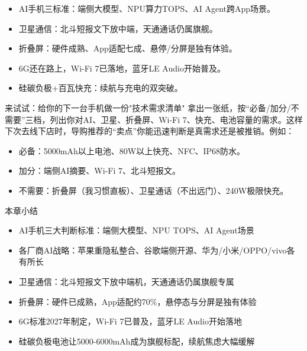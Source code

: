 \begin{itemize}
  \item AI手机三标准：端侧大模型、NPU算力TOPS、AI Agent跨App场景。
  \item 卫星通信：北斗短报文下放中端，天通通话仍属旗舰。
  \item 折叠屏：硬件成熟、App适配七成、悬停/分屏是独有体验。
  \item 6G还在路上，Wi-Fi 7已落地，蓝牙LE Audio开始普及。
  \item 硅碳负极+百瓦快充：续航与充电的双突破。
\end{itemize}

\begin{tcbpractice}{来试试：给你的下一台手机做一份"技术需求清单"}
拿出一张纸，按“必备/加分/不需要”三档，列出你对AI、卫星、折叠屏、Wi-Fi 7、快充、电池容量的需求。这样下次去线下店时，导购推荐的“卖点”你能迅速判断是真需求还是被推销。例如：

\begin{itemize}
  \item 必备：5000mAh以上电池、80W以上快充、NFC、IP68防水。
  \item 加分：端侧AI摘要、Wi-Fi 7、北斗短报文。
  \item 不需要：折叠屏（我习惯直板）、卫星通话（不出远门）、240W极限快充。
\end{itemize}

\end{tcbpractice}

\begin{tcbsummary}{本章小结}
\begin{itemize}
  \item AI手机三大判断标准：端侧大模型、NPU TOPS、AI Agent场景
  \item 各厂商AI战略：苹果重隐私整合、谷歌端侧开源、华为/小米/OPPO/vivo各有所长
  \item 卫星通信：北斗短报文下放中端机，天通通话仍属旗舰专属
  \item 折叠屏：硬件已成熟，App适配约70\%，悬停态与分屏是独有体验
  \item 6G标准2027年制定，Wi-Fi 7已普及，蓝牙LE Audio开始落地
  \item 硅碳负极电池让5000-6000mAh成为旗舰标配，续航焦虑大幅缓解
\end{itemize}

\end{tcbsummary}
